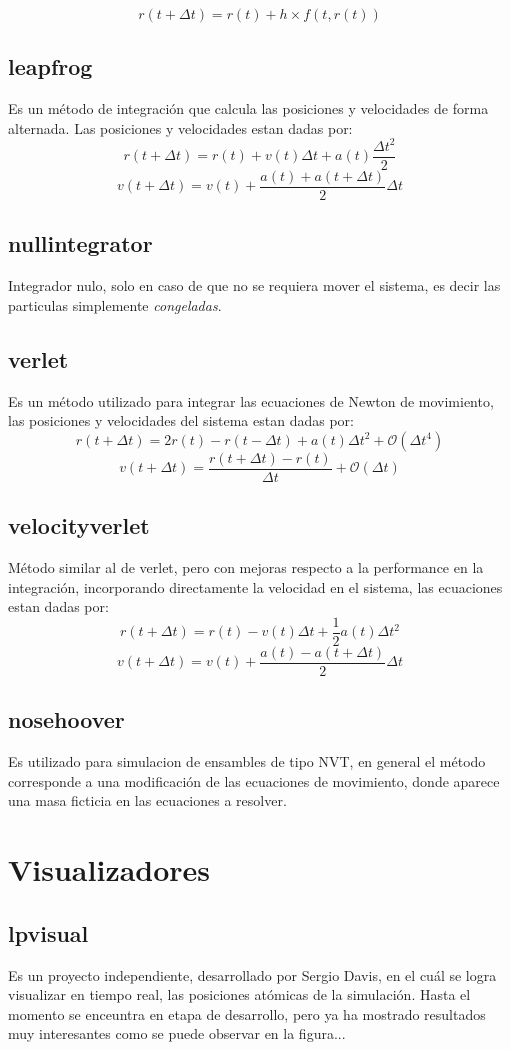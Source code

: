$$r(t+\Delta t) = r(t) + h\times f(t,r(t))$$

\subsection{leapfrog}
Es un m\'etodo de integraci\'on que calcula las posiciones y velocidades de forma alternada. Las posiciones y velocidades estan dadas por:
$$r(t+\Delta t) = r(t) + v(t)\Delta t + a(t)\frac{\Delta t^2}{2}$$
$$v(t+\Delta t) = v(t) + \frac{a(t)+a(t+\Delta t)}{2}\Delta t$$
\subsection{nullintegrator}
Integrador nulo, solo en caso de que no se requiera mover el sistema, es decir las particulas simplemente \textit{congeladas}.
\subsection{verlet}
Es un m\'etodo utilizado para integrar las ecuaciones de Newton de movimiento, las posiciones y velocidades del sistema estan dadas por:
$$r(t+\Delta t) = 2r(t) - r(t-\Delta t) + a(t)\Delta t^2 + \mathcal{O}(\Delta t^4)$$
$$v(t+\Delta t) = \frac{r(t+\Delta t) - r(t)}{\Delta t} + \mathcal{O}(\Delta t)$$
\subsection{velocityverlet}
M\'etodo similar al de verlet, pero con mejoras respecto a la performance en la integraci\'on, incorporando directamente la velocidad en el sistema, las ecuaciones estan dadas por:
$$r(t+\Delta t) = r(t) - v(t)\Delta t + \frac{1}{2}a(t)\Delta t^2$$
$$v(t+\Delta t) = v(t) + \frac{a(t) - a(t + \Delta t)}{2}\Delta t$$
\subsection{nosehoover}
Es utilizado para simulacion de ensambles de tipo NVT, en general el m\'etodo corresponde a una modificaci\'on de las ecuaciones de movimiento, donde aparece una masa ficticia en las ecuaciones a resolver.

\section{Visualizadores}
\subsection{lpvisual}
Es un proyecto independiente, desarrollado por Sergio Davis, en el cu\'al se logra visualizar en tiempo real, las posiciones at\'omicas de la simulaci\'on. Hasta el momento se enceuntra en etapa de desarrollo, pero ya ha mostrado resultados muy interesantes como se puede observar en la figura...

